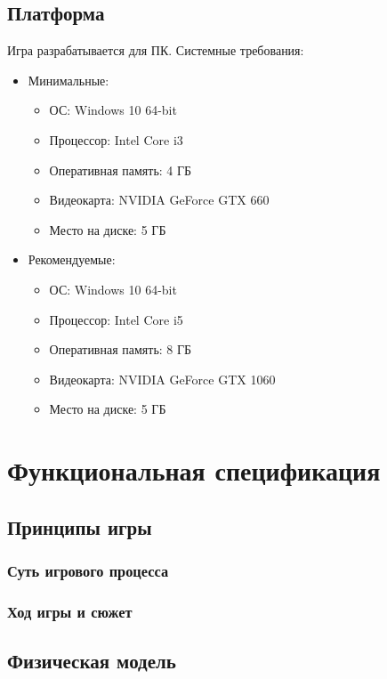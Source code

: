 \documentclass{article}
\begin{document}
\subsection{Платформа}
Игра разрабатывается для ПК. Системные требования:
\begin{itemize}
    \item Минимальные:
    \begin{itemize}
        \item ОС: Windows 10 64-bit
        \item Процессор: Intel Core i3
        \item Оперативная память: 4 ГБ
        \item Видеокарта: NVIDIA GeForce GTX 660
        \item Место на диске: 5 ГБ
    \end{itemize}
    \item Рекомендуемые:
    \begin{itemize}
        \item ОС: Windows 10 64-bit
        \item Процессор: Intel Core i5
        \item Оперативная память: 8 ГБ
        \item Видеокарта: NVIDIA GeForce GTX 1060
        \item Место на диске: 5 ГБ
    \end{itemize}
\end{itemize}

\section{Функциональная спецификация}

\subsection{Принципы игры}

\subsubsection{Суть игрового процесса}
\subsubsection{Ход игры и сюжет}

\subsection{Физическая модель}
\end{document}
